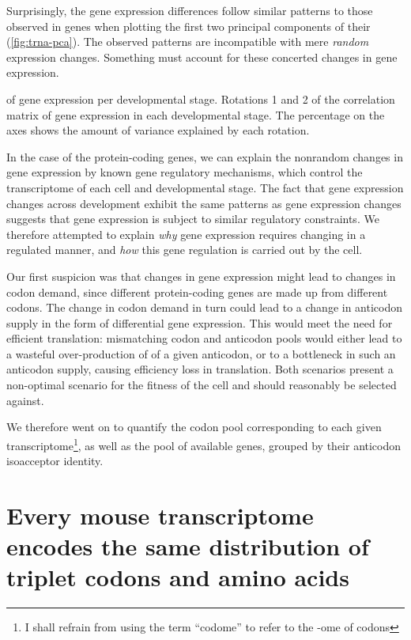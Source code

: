 Surprisingly, the \trna gene expression differences follow similar patterns to
those observed in \mrna genes when plotting the first two principal components
of their \pca (\cref{fig:trna-pca}). The observed patterns are incompatible with
mere \emph{random} expression changes. Something must account for these
concerted changes in \trna gene expression.

    {\pca of \trna gene expression per developmental stage.}
    {Rotations \num{1} and \num{2} of the correlation matrix of
    \trna gene expression in each developmental stage. The percentage on the
    axes shows the amount of variance explained by each rotation.}

In the case of the protein-coding genes, we can explain the nonrandom changes in
gene expression by known gene regulatory mechanisms, which control the
transcriptome of each cell and developmental stage. The fact that \trna gene
expression changes across development exhibit the same patterns as \mrna gene
expression changes suggests that \trna gene expression is subject to similar
regulatory constraints. We therefore attempted to explain \emph{why} \trna gene
expression requires changing in a regulated manner, and \emph{how} this \trna
gene regulation is carried out by the cell.

Our first suspicion was that changes in \mrna gene expression might lead to
changes in codon demand, since different protein-coding genes are made up from
different codons. The change in codon demand in turn could lead to a change in
anticodon supply in the form of differential \trna gene expression. This would
meet the need for efficient translation: mismatching codon and anticodon pools
would either lead to a wasteful over-production of \trna[s] of a given
anticodon, or to a bottleneck in such an anticodon supply, causing efficiency
loss in translation. Both scenarios present a non-optimal scenario for the
fitness of the cell and should reasonably be selected against.

We therefore went on to quantify the codon pool corresponding to each given
transcriptome\footnote{I shall refrain from using the term “codome” to refer to
the -ome of codons}, as well as the pool of available \trna genes, grouped by
their anticodon isoacceptor identity.

\section{Every mouse \mrna transcriptome encodes the same distribution of
triplet codons and amino acids}

